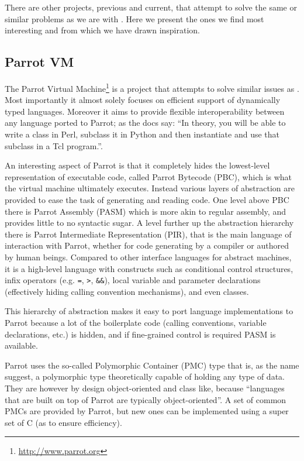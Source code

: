 There are other projects, previous and current, that attempt to solve the same
or similar problems as we are with \thename{}. Here we present the ones we find
most interesting and from which we have drawn inspiration.

\subsection{Parrot VM}

The Parrot Virtual Machine\footnote{\url{http://www.parrot.org}} is a project
that attempts to solve similar issues as \thename{}. Most importantly it almost
solely focuses on efficient support of dynamically typed languages. Moreover it
aims to provide flexible interoperability between any language ported to Parrot;
as the docs say: ``In theory, you will be able to write a class in Perl,
subclass it in Python and then instantiate and use that subclass in a Tcl
program.''\cite{parrot-docs}.

An interesting aspect of Parrot is that it completely hides the lowest-level
representation of executable code, called Parrot Bytecode (PBC), which is what
the virtual machine ultimately executes. Instead various layers of abstraction
are provided to ease the task of generating and reading code. One level above
PBC there is Parrot Assembly (PASM) which is more akin to regular assembly, and
provides little to no syntactic sugar. A level further up the abstraction
hierarchy there is Parrot Intermediate Representation (PIR), that is the main
language of interaction with Parrot, whether for code generating by a compiler
or authored by human beings. Compared to other interface languages for abstract
machines, it is a high-level language with constructs such as conditional
control structures, infix operators (e.g. \texttt{=}, \texttt{>},
\texttt{\&\&}), local variable and parameter declarations (effectively hiding
calling convention mechanisms), and even classes.

This hierarchy of abstraction makes it easy to port language implementations to
Parrot because a lot of the boilerplate code (calling conventions, variable
declarations, etc.) is hidden, and if fine-grained control is required PASM is
available.

Parrot uses the so-called Polymorphic Container (PMC) type that is, as the name
suggest, a polymorphic type theoretically capable of holding any type of
data. They are however by design object-oriented and class like, because
``languages that are built on top of Parrot are typically
object-oriented''\cite{parrot-docs}. A set of common PMCs are provided by
Parrot, but new ones can be implemented using a super set of C (as to ensure
efficiency).


